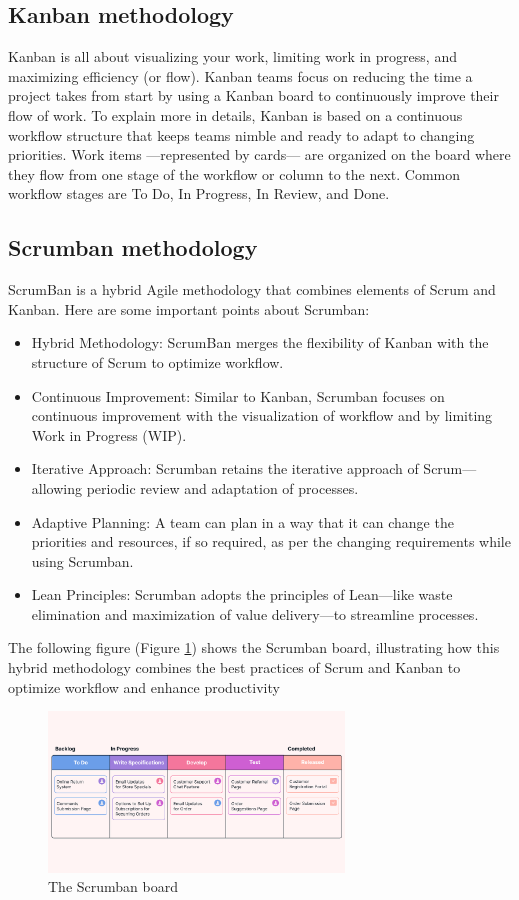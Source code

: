 \subsection{Kanban methodology}
Kanban is all about visualizing your work, limiting work in progress, and maximizing efficiency (or flow).
Kanban teams focus on reducing the time a project takes from start by using a Kanban board to continuously improve their flow of work.
To explain more in details, Kanban is based on a continuous workflow structure that keeps teams nimble and ready to adapt to changing priorities.
Work items —represented by cards— are organized on the board where they flow from one stage of the workflow or column to the next.
Common workflow stages are To Do, In Progress, In Review, and Done.

\subsection{Scrumban methodology}
ScrumBan is a hybrid Agile methodology that combines elements of Scrum and Kanban. Here are some important points about Scrumban:

\begin{itemize}
    \item Hybrid Methodology: ScrumBan merges the flexibility of Kanban with the structure of Scrum to optimize workflow.
    \item Continuous Improvement: Similar to Kanban, Scrumban focuses on continuous improvement with the visualization of workflow and by limiting Work in Progress (WIP).
    \item Iterative Approach: Scrumban retains the iterative approach of Scrum—allowing periodic review and adaptation of processes.
    \item Adaptive Planning: A team can plan in a way that it can change the priorities and resources, if so required, as per the changing requirements while using Scrumban.
    \item Lean Principles: Scrumban adopts the principles of Lean—like waste elimination and maximization of value delivery—to streamline processes.
\end{itemize}
The following figure (Figure \ref{fig:Scrumban_image}) shows the Scrumban board, illustrating how this hybrid methodology combines the best practices of Scrum and Kanban to optimize workflow and enhance productivity
\begin{figure}[H]
    \centering
    \includegraphics[width=0.7\textwidth]{src/assets/chapters/Scrumban.png}
    \caption{The Scrumban board}
    \label{fig:Scrumban_image}
\end{figure}

